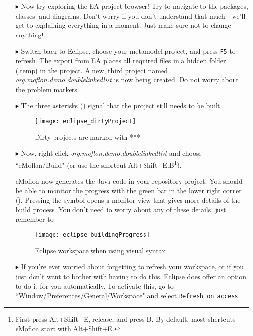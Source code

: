 \begin{itemize}
\item[$\blacktriangleright$] Now try exploring the EA project browser! Try to navigate to the packages, classes, and diagrams. Don't worry if you don't
understand that much - we'll get to explaining everything in a moment. Just make sure not to change anything!

\item[$\blacktriangleright$] Switch back to Eclipse, choose your metamodel project, and press \texttt{F5} to refresh. 
The export from EA places all required files in a hidden folder (.temp) in the project.
A new, third project named \emph{org.moflon.demo.doublelinkedlist} is now being created.
Do not worry about the problem markers.

\item[$\blacktriangleright$] The three asterisks () signal that the project still needs to be built.

\vspace{0.5cm}

\begin{figure}[htbp]
    \centering
    \texttt{[image: eclipse\_dirtyProject]}
    \caption{Dirty projects are marked with ***} 
    \label{eclipse:dirty-project} 
\end{figure}

\vspace{0.5cm}

\item[$\blacktriangleright$] Now, right-click \emph{org.moflon.demo.doublelinkedlist} and choose ``eMoflon/Build" (or use the shortcut Alt+Shift+E,B\footnote{First press Alt+Shift+E, release, and press B.
By default, most shortcuts eMoflon start with Alt+Shift+E.}).

eMoflon now generates the Java code in your repository project.
You should be able to monitor the progress with the green bar in the lower right corner (). Pressing the
symbol opens a monitor view that gives more details of the build process. You don't need to worry about any of these details, just remember to 

\begin{figure}[htbp]
    \centering
    \texttt{[image: eclipse\_buildingProgress]}
    \caption{Eclipse workspace when using visual syntax} 
    \label{eclipse:build} 
\end{figure}

\item[$\blacktriangleright$] If you're ever worried about forgetting to refresh your workspace, or if you just don't want to bother with having to do this,
Eclipse does offer an option to do it for you automatically. To activate this, go to ``Window/Preferences/General/Workspace" and select \texttt{Refresh on
access}.

\end{itemize}